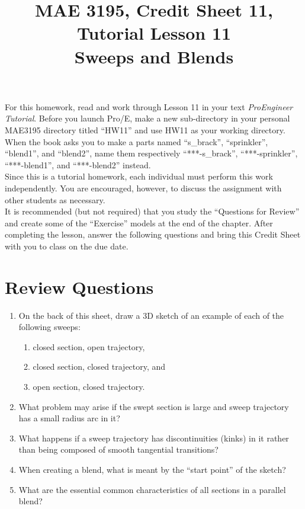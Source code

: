 \documentclass[12pt]{article}
\title{MAE 3195, Credit Sheet 11, Tutorial Lesson 11\\
Sweeps and Blends}
\date{}
\begin{document}
\maketitle

For this homework, read and work through Lesson 11 in your text \textit{ProEngineer Tutorial}. Before you launch Pro/E, make a new sub-directory in your personal MAE3195 directory titled ``HW11'' and use HW11 as your working directory. When the book asks you to make a parts named ``s\_brack'', ``sprinkler'', ``blend1'', and ``blend2'', name them respectively ``***-s\_brack'', ``***-sprinkler'', ``***-blend1'', and ``***-blend2'' instead.\\

Since this is a tutorial homework, each individual must perform this work independently. You are encouraged, however, to discuss the assignment with other students as necessary.\\

It is recommended (but not required) that you study the ``Questions for Review'' and create some of the ``Exercise'' models at the end of the chapter. After completing the lesson, answer the following questions and bring this Credit Sheet with you to class on the due date.

\pagebreak

\section*{Review Questions}
\begin{enumerate}
	\item On the back of this sheet, draw a 3D sketch of an example of each of the following sweeps:
	\begin{enumerate}
		\item closed section, open trajectory,
		\item closed section, closed trajectory, and
		\item open section, closed trajectory.
	\end{enumerate}
	
	\vspace{0.25in}
	\item What problem may arise if the swept section is large and sweep trajectory has a small radius arc in it?
	\vspace{1.25in}
	\item What happens if a sweep trajectory has discontinuities (kinks) in it rather than being composed of smooth tangential transitions?
	\vspace{1.25in}
	\item When creating a blend, what is meant by the ``start point'' of the sketch?
	\vspace{1.25in}
	\item What are the essential common characteristics of all sections in a parallel blend?
\end{enumerate}
\end{document}
